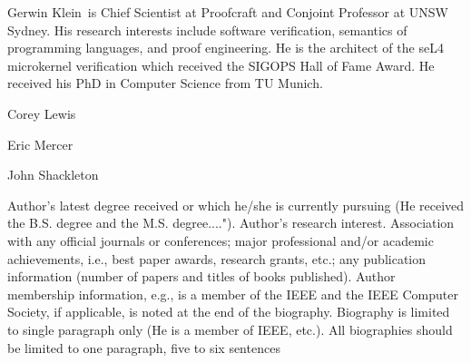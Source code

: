\begin{IEEEbiography}{Gerwin Klein}{\,}
is Chief Scientist at Proofcraft and Conjoint Professor at UNSW Sydney. His
research interests include software verification, semantics of programming
languages, and proof engineering. He is the architect of the seL4 microkernel
verification which received the SIGOPS Hall of Fame Award. He received his PhD
in Computer Science from TU Munich.
\end{IEEEbiography}

\begin{IEEEbiography}{Corey Lewis}{\,}
\end{IEEEbiography}

\begin{IEEEbiography}{Eric Mercer}{\,}
\end{IEEEbiography}

\begin{IEEEbiography}{John Shackleton}{\,}
\end{IEEEbiography}

Author's latest degree received or which he/she is currently pursuing
(He received the B.S. degree and the M.S. degree...."). Author's
research interest. Association with any official journals or
conferences; major professional and/or academic achievements, i.e.,
best paper awards, research grants, etc.; any publication information
(number of papers and titles of books published). Author membership
information, e.g., is a member of the IEEE and the IEEE Computer
Society, if applicable, is noted at the end of the
biography. Biography is limited to single paragraph only (He is a
member of IEEE, etc.). All biographies should be limited to one
paragraph, five to six sentences
